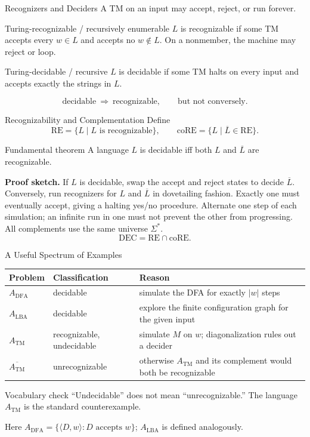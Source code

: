 \documentclass[10pt]{beamer}
\newcommand{\ATM}{A_{\mathrm{TM}}}
\newcommand{\RE}{\mathrm{RE}}
\newcommand{\coRE}{\mathrm{coRE}}
\begin{document}
\begin{frame}{Recognizers and Deciders}
  A TM on an input may accept, reject, or run forever.
  \begin{block}{Turing-recognizable / recursively enumerable}
    $L$ is recognizable if some TM accepts every $w\in L$ and accepts no $w\notin L$.
    On a nonmember, the machine may reject or loop.
  \end{block}
  \begin{block}{Turing-decidable / recursive}
    $L$ is decidable if some TM halts on every input and accepts exactly the strings in $L$.
  \end{block}
  \[
    \text{decidable}\ \Longrightarrow\ \text{recognizable},
    \qquad\text{but not conversely.}
  \]
\end{frame}

\begin{frame}{Recognizability and Complementation}
  Define
  \[
    \RE=\{L\mid L\text{ is recognizable}\},
    \qquad
    \coRE=\{L\mid \overline{L}\in\RE\}.
  \]
  \begin{block}{Fundamental theorem}
    A language $L$ is decidable iff both $L$ and $\overline{L}$ are recognizable.
  \end{block}
  \textbf{Proof sketch.}
  If $L$ is decidable, swap the accept and reject states to decide $\overline L$.
  Conversely, run recognizers for $L$ and $\overline L$ in dovetailing fashion. Exactly one must
  eventually accept, giving a halting yes/no procedure.
  Alternate one step of each simulation; an infinite run in one must not
  prevent the other from progressing. All complements use the same universe $\Sigma^*$.
  \[
    \mathrm{DEC}=\RE\cap\coRE.
  \]
\end{frame}

\begin{frame}{A Useful Spectrum of Examples}
  \small
  \begin{center}
  \begin{tabular}{L{2.2cm}L{2.8cm}L{4.3cm}}
    \toprule
    Problem & Classification & Reason \\
    \midrule
    $A_{\mathrm{DFA}}$ & decidable & simulate the DFA for exactly $|w|$ steps \\
    $A_{\mathrm{LBA}}$ & decidable & explore the finite configuration graph for the given input \\
    $\ATM$ & recognizable, undecidable & simulate $M$ on $w$; diagonalization rules out a decider \\
    $\overline{\ATM}$ & unrecognizable & otherwise $\ATM$ and its complement would both be recognizable \\
    \bottomrule
  \end{tabular}
  \end{center}
  \begin{alertblock}{Vocabulary check}
    ``Undecidable'' does not mean ``unrecognizable.'' The language $\ATM$ is the standard counterexample.
  \end{alertblock}
  Here $A_{\mathrm{DFA}}=\{\langle D,w\rangle:D\text{ accepts }w\}$;
  $A_{\mathrm{LBA}}$ is defined analogously.
\end{frame}
\end{document}

